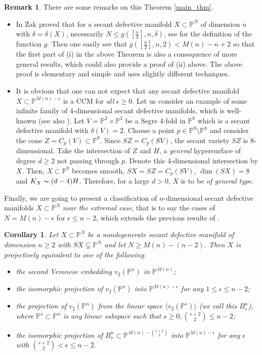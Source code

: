 \documentclass[11pt]{amsart}
\def\P{{\mathbb P}}
\theoremstyle{theorem} %
\newtheorem{Coro}[Thm]{Corollary}
\theoremstyle{definition}
\newtheorem{Remk}[Thm]{Remark}
\numberwithin{equation}{section}
\begin{document}
\begin{Remk}\label{rationality}
There are some remarks on this Theorem \ref{main_thm}.

\begin{itemize}
\item[(a)] In \cite{Z1} Zak proved that for a secant defective manifold $X\subset\P^N$ of dimension $n$ with $\delta=\delta(X)$, necessarily $N\le g([\frac{n}{\delta}],n,\delta)$, see \cite{Z1} for the definition of the function $g$. Then one easily see that $g([\frac{n}{2}],n,2) < M(n) -n+2$ so that the first part of (i) in the above Theorem is also a consequence of more general results, which could also provide a proof of (ii) above. The above proof is elementary and simple and uses slightly different techniques.
\item[(b)] It is obvious that one can not expect that any secant defective manifold $X\subset\P^{M(n)-\epsilon}$ is a CCM for \textit{all} $\epsilon\ge0$. Let us consider an example of some infinite family of $4$-dimensional secant defective manifolds, which is well-known (see also \cite{FR}). Let $V=\P^2\times\P^2$ be a Segre 4-fold in $\P^8$ which is a secant defective manifold with $\delta(V)=2$. Choose a point $p\in\P^9 \setminus \P^8$ and consider the cone $Z=C_p(V)\subset\P^9$. Since $SZ=C_p(SV)$, the secant variety $SZ$ is 8-dimensional. Take the intersection of $Z$ and $H$, a \textit{general} hypersurface of degree $d\ge2$ not passing through $p$. Denote this 4-dimensional intersection by $X$. Then, $X\subset\P^9$ becomes smooth, $SX=SZ=C_p(SV)$, $\dim(SX)=8$ and $K_X \thicksim (d-4)H$. Therefore, for a large $d>0$, $X$ is to be \textit{of general type}.
\end{itemize}
\end{Remk}

Finally, we are going to present a classification of $n$-dimensional secant defective manifolds $X\subset\P^N$ \textit{near the extremal case}, that is to say the cases of $N=M(n)-\epsilon$ for $\epsilon\le n-2$, which extends the previous results of \cite{Z1,MSS}.

\begin{Coro}\label{class_almost}
Let $X\subset \P^N$ be a nondegenerate secant defective manifold of dimension $n\ge 2$ with $SX\subsetneq \P^N$ and let $N\ge M(n)-(n-2)$. Then $X$ is projectively equivalent to one of the following:
\begin{itemize}
\item[(i)] the second Veronese embedding $v_2(\P^n)$ in $\P^{M(n)}$;
\item[(ii)] the isomorphic projection of $v_2(\P^n)$ into $\P^{M(n)-\epsilon}$ for any $1\le\epsilon\le n-2$;
\item[(iii)] the projection of $v_2(\P^n)$ from the linear space $\langle v_2(\P^s)\rangle$ (we call this $B^n_s$), where $\P^s\subset\P^n$ is any linear subspace such that $s\ge 0, {s+2\choose 2}\le n-2$;
\item[(iv)] the isomorphic projection of $B^n_s\subset\P^{M(n)-{s+2 \choose 2}}$ into $\P^{M(n)-\epsilon}$ for any $\epsilon$ with ${s+2 \choose 2}<\epsilon\le n-2$.
\end{itemize}
\end{Coro}
\end{document}
